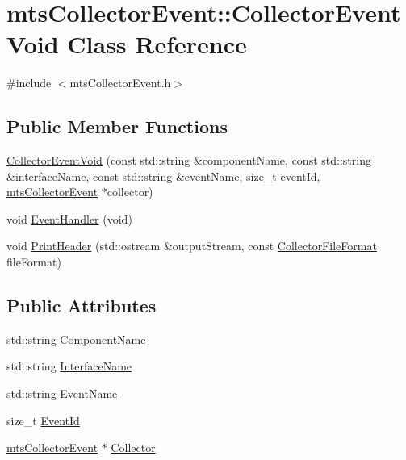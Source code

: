 \hypertarget{classmts_collector_event_1_1_collector_event_void}{\section{mts\-Collector\-Event\-:\-:Collector\-Event\-Void Class Reference}
\label{classmts_collector_event_1_1_collector_event_void}
}


{\ttfamily \#include $<$mts\-Collector\-Event.\-h$>$}

\subsection*{Public Member Functions}
\begin{DoxyCompactItemize}
\item 
\hyperlink{classmts_collector_event_1_1_collector_event_void_a1778ca501149cc782270214389d58377}{Collector\-Event\-Void} (const std\-::string \&component\-Name, const std\-::string \&interface\-Name, const std\-::string \&event\-Name, size\-\_\-t event\-Id, \hyperlink{classmts_collector_event}{mts\-Collector\-Event} $\ast$collector)
\item 
void \hyperlink{classmts_collector_event_1_1_collector_event_void_a8499a95da2b6c0b5d4021beb10aada8d}{Event\-Handler} (void)
\item 
void \hyperlink{classmts_collector_event_1_1_collector_event_void_a0d13838f8781f04139ae21873161bc96}{Print\-Header} (std\-::ostream \&output\-Stream, const \hyperlink{classmts_collector_base_aa228bed8144053d0bfa316f9ac9d0901}{Collector\-File\-Format} file\-Format)
\end{DoxyCompactItemize}
\subsection*{Public Attributes}
\begin{DoxyCompactItemize}
\item 
std\-::string \hyperlink{classmts_collector_event_1_1_collector_event_void_af7494d63892c827f73543dadcc919df7}{Component\-Name}
\item 
std\-::string \hyperlink{classmts_collector_event_1_1_collector_event_void_a40cc93e11bb1411b32e608030473939d}{Interface\-Name}
\item 
std\-::string \hyperlink{classmts_collector_event_1_1_collector_event_void_a5519a90042bb42041e6aea5e4859952c}{Event\-Name}
\item 
size\-\_\-t \hyperlink{classmts_collector_event_1_1_collector_event_void_a50253a8a23a0e44f3da25bbf006a544b}{Event\-Id}
\item 
\hyperlink{classmts_collector_event}{mts\-Collector\-Event} $\ast$ \hyperlink{classmts_collector_event_1_1_collector_event_void_a06032b3263c7e19f5bbe84ad3c5730db}{Collector}
\end{DoxyCompactItemize}


